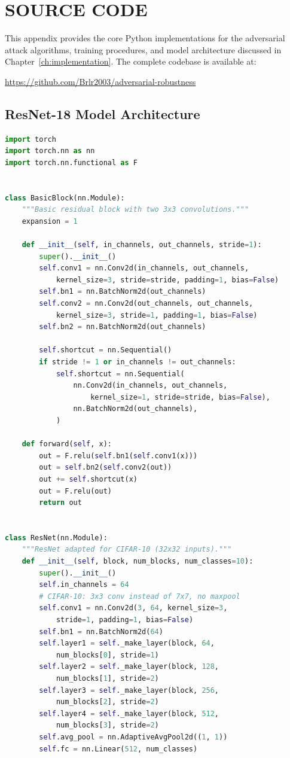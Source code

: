 \chapter{SOURCE CODE}
\label{ch:appendix_code}

This appendix provides the core Python implementations for the adversarial attack algorithms, training procedures, and model architecture discussed in Chapter~\ref{ch:implementation}. The complete codebase is available at:

\noindent\url{https://github.com/Brlr2003/adversarial-robustness}

\section{ResNet-18 Model Architecture}

\begin{lstlisting}[language=Python, caption={ResNet-18 Architecture for CIFAR-10}, label={lst:resnet}]
import torch
import torch.nn as nn
import torch.nn.functional as F


class BasicBlock(nn.Module):
    """Basic residual block with two 3x3 convolutions."""
    expansion = 1

    def __init__(self, in_channels, out_channels, stride=1):
        super().__init__()
        self.conv1 = nn.Conv2d(in_channels, out_channels,
            kernel_size=3, stride=stride, padding=1, bias=False)
        self.bn1 = nn.BatchNorm2d(out_channels)
        self.conv2 = nn.Conv2d(out_channels, out_channels,
            kernel_size=3, stride=1, padding=1, bias=False)
        self.bn2 = nn.BatchNorm2d(out_channels)

        self.shortcut = nn.Sequential()
        if stride != 1 or in_channels != out_channels:
            self.shortcut = nn.Sequential(
                nn.Conv2d(in_channels, out_channels,
                    kernel_size=1, stride=stride, bias=False),
                nn.BatchNorm2d(out_channels),
            )

    def forward(self, x):
        out = F.relu(self.bn1(self.conv1(x)))
        out = self.bn2(self.conv2(out))
        out += self.shortcut(x)
        out = F.relu(out)
        return out


class ResNet(nn.Module):
    """ResNet adapted for CIFAR-10 (32x32 inputs)."""
    def __init__(self, block, num_blocks, num_classes=10):
        super().__init__()
        self.in_channels = 64
        # CIFAR-10: 3x3 conv instead of 7x7, no maxpool
        self.conv1 = nn.Conv2d(3, 64, kernel_size=3,
            stride=1, padding=1, bias=False)
        self.bn1 = nn.BatchNorm2d(64)
        self.layer1 = self._make_layer(block, 64,
            num_blocks[0], stride=1)
        self.layer2 = self._make_layer(block, 128,
            num_blocks[1], stride=2)
        self.layer3 = self._make_layer(block, 256,
            num_blocks[2], stride=2)
        self.layer4 = self._make_layer(block, 512,
            num_blocks[3], stride=2)
        self.avg_pool = nn.AdaptiveAvgPool2d((1, 1))
        self.fc = nn.Linear(512, num_classes)


\end{lstlisting}
